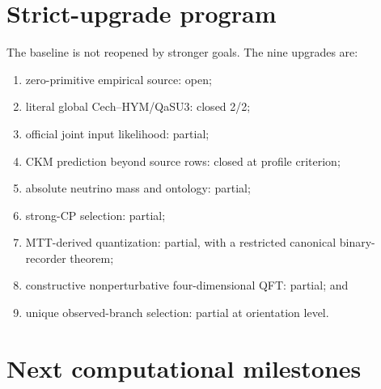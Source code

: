 \documentclass[11pt]{article}
\begin{document}
\section{Strict-upgrade program}

The baseline is not reopened by stronger goals. The nine upgrades are:
\begin{enumerate}
\item[U1.] zero-primitive empirical source: open;
\item[U2.] literal global Cech--HYM/QaSU3: closed 2/2;
\item[U3.] official joint input likelihood: partial;
\item[U4.] CKM prediction beyond source rows: closed at profile criterion;
\item[U5.] absolute neutrino mass and ontology: partial;
\item[U6.] strong-CP selection: partial;
\item[U7.] MTT-derived quantization: partial, with a restricted canonical
binary-recorder theorem;
\item[U8.] constructive nonperturbative four-dimensional QFT: partial; and
\item[U9.] unique observed-branch selection: partial at orientation level.
\end{enumerate}

\section{Next computational milestones}
\end{document}
